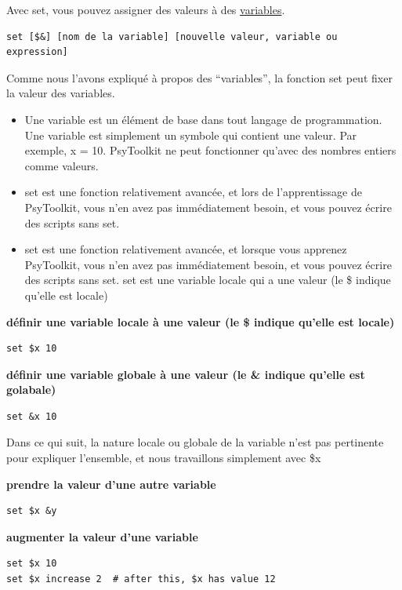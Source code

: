 \documentclass[
]{book}
\providecommand{\tightlist}{%
  \setlength{\itemsep}{0pt}\setlength{\parskip}{0pt}}
\begin{document}
Avec set, vous pouvez assigner des valeurs à des \protect\hyperlink{variables-explained}{variables}.

\begin{verbatim}
set [$&] [nom de la variable] [nouvelle valeur, variable ou expression]
\end{verbatim}

Comme nous l'avons expliqué à propos des ``variables'', la fonction set peut fixer la valeur des variables.

\begin{itemize}
\tightlist
\item
  Une variable est un élément de base dans tout langage de programmation. Une variable est simplement un symbole qui contient une valeur. Par exemple, x = 10. PsyToolkit ne peut fonctionner qu'avec des nombres entiers comme valeurs.
\item
  set est une fonction relativement avancée, et lors de l'apprentissage de PsyToolkit, vous n'en avez pas immédiatement besoin, et vous pouvez écrire des scripts sans set.
\item
  set est une fonction relativement avancée, et lorsque vous apprenez PsyToolkit, vous n'en avez pas immédiatement besoin, et vous pouvez écrire des scripts sans set. set est une variable locale qui a une valeur (le \$ indique qu'elle est locale)
\end{itemize}

\textbf{définir une variable locale à une valeur (le \$ indique qu'elle est locale)}

\begin{verbatim}
set $x 10
\end{verbatim}

\textbf{définir une variable globale à une valeur (le \& indique qu'elle est golabale)}

\begin{verbatim}
set &x 10
\end{verbatim}

Dans ce qui suit, la nature locale ou globale de la variable n'est pas pertinente pour expliquer l'ensemble, et nous travaillons simplement avec \$x

\textbf{prendre la valeur d'une autre variable}

\begin{verbatim}
set $x &y
\end{verbatim}

\textbf{augmenter la valeur d'une variable}

\begin{verbatim}
set $x 10
set $x increase 2  # after this, $x has value 12
\end{verbatim}
\end{document}
